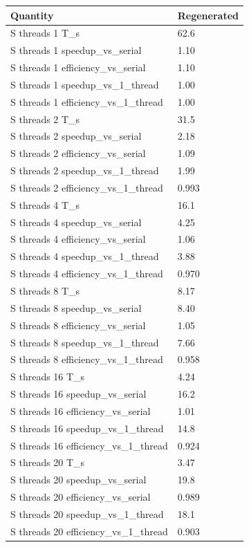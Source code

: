 \begin{tabular}{ll}
Quantity & Regenerated \\
\hline
S threads 1 T\_s & 62.6 \\
S threads 1 speedup\_vs\_serial & 1.10 \\
S threads 1 efficiency\_vs\_serial & 1.10 \\
S threads 1 speedup\_vs\_1\_thread & 1.00 \\
S threads 1 efficiency\_vs\_1\_thread & 1.00 \\
S threads 2 T\_s & 31.5 \\
S threads 2 speedup\_vs\_serial & 2.18 \\
S threads 2 efficiency\_vs\_serial & 1.09 \\
S threads 2 speedup\_vs\_1\_thread & 1.99 \\
S threads 2 efficiency\_vs\_1\_thread & 0.993 \\
S threads 4 T\_s & 16.1 \\
S threads 4 speedup\_vs\_serial & 4.25 \\
S threads 4 efficiency\_vs\_serial & 1.06 \\
S threads 4 speedup\_vs\_1\_thread & 3.88 \\
S threads 4 efficiency\_vs\_1\_thread & 0.970 \\
S threads 8 T\_s & 8.17 \\
S threads 8 speedup\_vs\_serial & 8.40 \\
S threads 8 efficiency\_vs\_serial & 1.05 \\
S threads 8 speedup\_vs\_1\_thread & 7.66 \\
S threads 8 efficiency\_vs\_1\_thread & 0.958 \\
S threads 16 T\_s & 4.24 \\
S threads 16 speedup\_vs\_serial & 16.2 \\
S threads 16 efficiency\_vs\_serial & 1.01 \\
S threads 16 speedup\_vs\_1\_thread & 14.8 \\
S threads 16 efficiency\_vs\_1\_thread & 0.924 \\
S threads 20 T\_s & 3.47 \\
S threads 20 speedup\_vs\_serial & 19.8 \\
S threads 20 efficiency\_vs\_serial & 0.989 \\
S threads 20 speedup\_vs\_1\_thread & 18.1 \\
S threads 20 efficiency\_vs\_1\_thread & 0.903 \\

\end{tabular}
